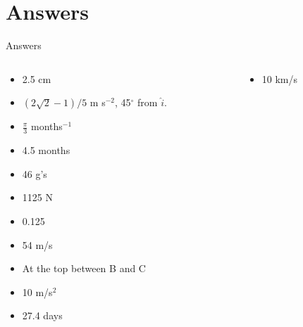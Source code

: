 \documentclass{beamer}
\begin{document}
\section{Answers}

\begin{frame}{Answers}
\begin{columns}[T]
\begin{column}{0.5\textwidth}
\begin{itemize}
\item 2.5 cm
\item $(2\sqrt{2}-1)/5$ m s$^{-2}$, 45$^{\circ}$ from $\hat{i}$.
\item $\frac{\pi}{3}$ months$^{-1}$
\item 4.5 months
\item 46 g's
\item 1125 N
\item 0.125
\item 54 m/s
\item At the top between B and C
\item 10 m/s$^2$
\item 27.4 days
\end{itemize}
\end{column}
\begin{column}{0.5\textwidth}
\begin{itemize}
\item 10 km/s 
\end{itemize}
\end{column}
\end{columns}
\end{frame}
\end{document}
